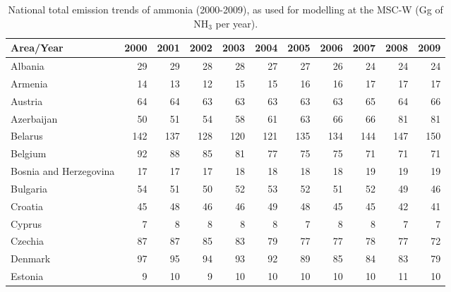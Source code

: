  \begin{table}
 \caption{National total emission trends of  ammonia (2000-2009), as used for modelling at the MSC-W (Gg of NH$_3$ per year).}
 
 \vspace{15pt}
 
 \scriptsize
 \centering
 \begin{tabular}{|l|r|r|r|r|r|r|r|r|r|r|}
 \hline
                     Area/Year&   2000&   2001&   2002&   2003&   2004&   2005&   2006&   2007&   2008&   2009\\\hline\hline
                       Albania&     29&     29&     28&     28&     27&     27&     26&     24&     24&     24\\\hline
                       Armenia&     14&     13&     12&     15&     15&     16&     16&     17&     17&     17\\\hline
                       Austria&     64&     64&     63&     63&     63&     63&     63&     65&     64&     66\\\hline
                    Azerbaijan&     50&     51&     54&     58&     61&     63&     66&     66&     81&     81\\\hline
                       Belarus&    142&    137&    128&    120&    121&    135&    134&    144&    147&    150\\\hline
                       Belgium&     92&     88&     85&     81&     77&     75&     75&     71&     71&     71\\\hline
        Bosnia and Herzegovina&     17&     17&     17&     18&     18&     18&     18&     19&     19&     19\\\hline
                      Bulgaria&     54&     51&     50&     52&     53&     52&     51&     52&     49&     46\\\hline
                       Croatia&     45&     48&     46&     46&     49&     48&     45&     45&     42&     41\\\hline
                        Cyprus&      7&      8&      8&      8&      8&      7&      8&      8&      7&      7\\\hline
                       Czechia&     87&     87&     85&     83&     79&     77&     77&     78&     77&     72\\\hline
                       Denmark&     97&     95&     94&     93&     92&     89&     85&     84&     83&     79\\\hline
                       Estonia&      9&     10&      9&     10&     10&     10&     10&     10&     11&     10\\\hline

\end{tabular}
\end{table}
